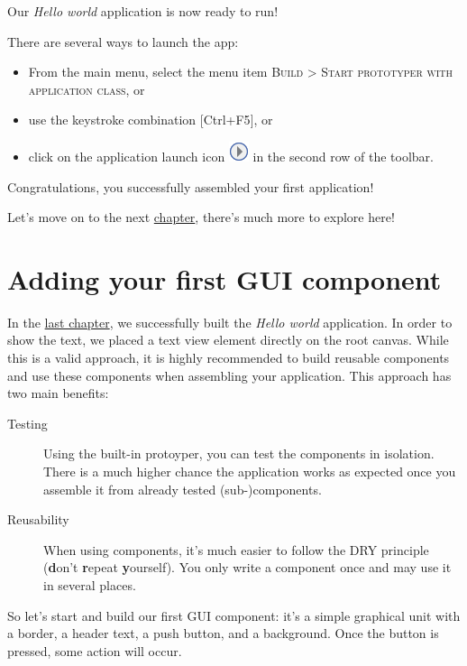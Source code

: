 \documentclass[
  a4paper,
,tablecaptionabove
]{scrbook}
\begin{document}
Our \emph{Hello world} application is now ready to run!

There are several ways to launch the app:

\begin{itemize}
\item
  From the main menu, select the menu item \textsc{Build > Start prototyper
  with application class}, or
\item
  use the keystroke combination {[}Ctrl+F5{]}, or
\item
  click on the application launch icon
  \includegraphics{./../asciidoc/modules/ROOT/assets/images/icons/LaunchApplicationIcon.png}
  in the second row of the toolbar.
\end{itemize}

Congratulations, you successfully assembled your first application!

Let's move on to the next \href{:FirstComponent.xml}{chapter}, there's
much more to explore here!

\chapter{Adding your first GUI component}


In the \href{:HelloWorld.xml}{last chapter}, we successfully built the
\emph{Hello world} application. In order to show the text, we placed a
text view element directly on the root canvas. While this is a valid
approach, it is highly recommended to build reusable components and use
these components when assembling your application. This approach has two
main benefits:

\begin{description}
\item[Testing]
Using the built-in protoyper, you can test the components in isolation.
There is a much higher chance the application works as expected once you
assemble it from already tested (sub-)components.
\item[Reusability]
When using components, it's much easier to follow the DRY principle
(\textbf{d}on't \textbf{r}epeat \textbf{y}ourself). You only write a
component once and may use it in several places.
\end{description}

So let's start and build our first GUI component: it's a simple
graphical unit with a border, a header text, a push button, and a
background. Once the button is pressed, some action will occur.
\end{document}
